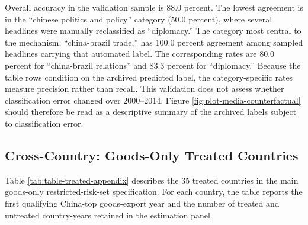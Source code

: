 \documentclass[referee,pdflatex,sn-basic]{sn-jnl}
\theoremstyle{thmstylethree}
\begin{document}
Overall accuracy in the validation sample is 88.0 percent. The lowest agreement is in the ``chinese politics and policy'' category (50.0 percent), where several headlines were manually reclassified as ``diplomacy.'' The category most central to the mechanism, ``china-brazil trade,'' has 100.0 percent agreement among sampled headlines carrying that automated label. The corresponding rates are 80.0 percent for ``china-brazil relations'' and 83.3 percent for ``diplomacy.'' Because the table rows condition on the archived predicted label, the category-specific rates measure precision rather than recall. This validation does not assess whether classification error changed over 2000--2014. Figure \ref{fig:plot-media-counterfactual} should therefore be read as a descriptive summary of the archived labels subject to classification error.

\clearpage

\subsection*{Cross-Country: Goods-Only Treated Countries}\label{cross-country-goods-only-treated-countries}

Table \ref{tab:table-treated-appendix} describes the 35 treated countries in the main goods-only restricted-risk-set specification. For each country, the table reports the first qualifying China-top goods-export year and the number of treated and untreated country-years retained in the estimation panel.
\end{document}
